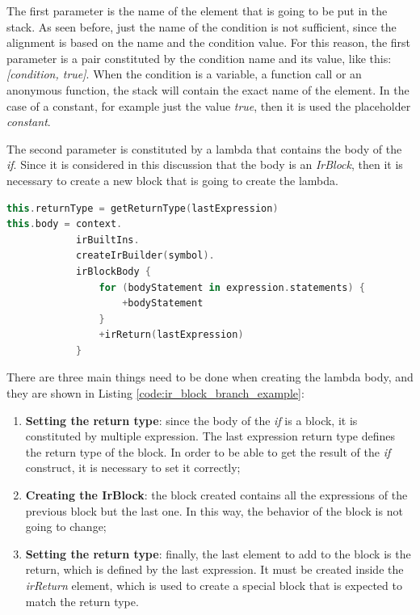 The first parameter is the name of the element that is going to be put in the stack. As seen before, just the name of the condition is not sufficient, since the alignment is based on the name and the condition value. For this reason, the first parameter is a pair constituted by the condition name and its value, like this: \textit{[condition, true]}.\newline
When the condition is a variable, a function call or an anonymous function, the stack will contain the exact name of the element. In the case of a constant, for example just the value \textit{true}, then it is used the placeholder \textit{constant}.

The second parameter is constituted by a lambda that contains the body of the \textit{if}. Since it is considered in this discussion that the body is an \textit{IrBlock}, then it is necessary to create a new block that is going to create the lambda.
\begin{lstlisting}[caption={Creation of the lambda body when modifying a \textit{IrBranch}}, captionpos=b, language=Kotlin, label={code:ir_block_branch_example}]
this.returnType = getReturnType(lastExpression)
this.body = context.
            irBuiltIns.
            createIrBuilder(symbol).
            irBlockBody {
                for (bodyStatement in expression.statements) { 
                    +bodyStatement 
                }
                +irReturn(lastExpression)
            }
\end{lstlisting}
There are three main things need to be done when creating the lambda body, and they are shown in Listing \ref{code:ir_block_branch_example}:
\begin{enumerate}
    \item \textbf{Setting the return type}: since the body of the \textit{if} is a block, it is constituted by multiple expression. The last expression return type defines the return type of the block. In order to be able to get the result of the \textit{if} construct, it is necessary to set it correctly;
    \item \textbf{Creating the IrBlock}: the block created contains all the expressions of the previous block but the last one. In this way, the behavior of the block is not going to change;
    \item \textbf{Setting the return type}: finally, the last element to add to the block is the return, which is defined by the last expression. It must be created inside the \textit{irReturn} element, which is used to create a special block that is expected to match the return type.
\end{enumerate}


